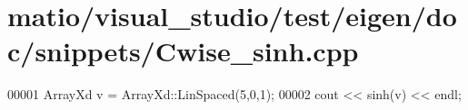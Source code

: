 \hypertarget{matio_2visual__studio_2test_2eigen_2doc_2snippets_2_cwise__sinh_8cpp_source}{}\section{matio/visual\+\_\+studio/test/eigen/doc/snippets/\+Cwise\+\_\+sinh.cpp}
\label{matio_2visual__studio_2test_2eigen_2doc_2snippets_2_cwise__sinh_8cpp_source}

\begin{DoxyCode}
00001 ArrayXd v = ArrayXd::LinSpaced(5,0,1);
00002 cout << sinh(v) << endl;
\end{DoxyCode}

